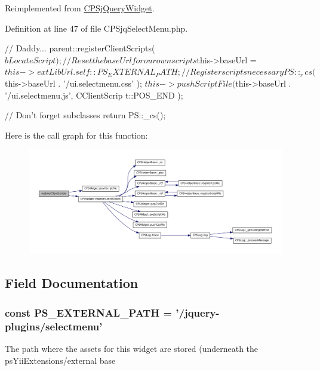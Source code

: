 Reimplemented from \hyperlink{classCPSjQueryWidget_a79bf828ed852174a56c4db5ef918a83c}{CPSjQueryWidget}.



Definition at line 47 of file CPSjqSelectMenu.php.




\begin{DoxyCode}
    {
        //  Daddy...
        parent::registerClientScripts( $bLocateScript );
        
        //  Reset the baseUrl for our own scripts
        $this->baseUrl = $this->extLibUrl . self::PS_EXTERNAL_PATH;
        
        //  Register scripts necessary
        PS::_rcs( $this->baseUrl . '/ui.selectmenu.css' );
        $this->pushScriptFile( $this->baseUrl . '/ui.selectmenu.js', CClientScrip
      t::POS_END );

        //  Don't forget subclasses
        return PS::_cs();
    }
\end{DoxyCode}




Here is the call graph for this function:\nopagebreak
\begin{figure}[H]
\begin{center}
\leavevmode
\includegraphics[width=400pt]{classCPSjqSelectMenu_ac02a66bde8e72e4909137bf748edf665_cgraph}
\end{center}
\end{figure}




\subsection{Field Documentation}
\hypertarget{classCPSjqSelectMenu_a8ccb5e1d65c091f944a6aa8c5be834ca}{
\subsubsection[{PS\_\-EXTERNAL\_\-PATH}]{\setlength{\rightskip}{0pt plus 5cm}const {\bf PS\_\-EXTERNAL\_\-PATH} = '/jquery-\/plugins/selectmenu'}}
\label{classCPSjqSelectMenu_a8ccb5e1d65c091f944a6aa8c5be834ca}
The path where the assets for this widget are stored (underneath the psYiiExtensions/external base 

